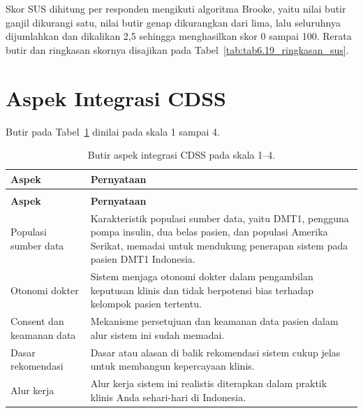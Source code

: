 Skor SUS dihitung per responden mengikuti algoritma Brooke, yaitu nilai butir ganjil dikurangi satu, nilai butir genap dikurangkan dari lima, lalu seluruhnya
dijumlahkan dan dikalikan 2,5 sehingga menghasilkan skor 0 sampai 100. Rerata butir dan ringkasan skornya disajikan pada Tabel~\ref{tab:tab6.19_ringkasan_sus}.

\section{Aspek Integrasi CDSS}
\label{lamp:instrumen-integrasi}

Butir pada Tabel~\ref{tab:lampC-integrasi} dinilai pada skala 1 sampai 4.

\begingroup
\setlength{\LTcapwidth}{\textwidth}
\begin{longtable}{@{}>{\raggedright\arraybackslash}p{3.300cm}>{\raggedright\arraybackslash}p{10.278cm}@{}}
\caption{Butir aspek integrasi CDSS pada skala 1--4.}
\label{tab:lampC-integrasi} \\
\toprule
\textbf{Aspek} & \textbf{Pernyataan} \\
\midrule
\endfirsthead

\multicolumn{2}{@{}l}{\small\emph{Tabel \thetable{} (lanjutan)}} \\
\toprule
\textbf{Aspek} & \textbf{Pernyataan} \\
\midrule
\endhead

\bottomrule
\endlastfoot

Populasi sumber data & Karakteristik populasi sumber data, yaitu DMT1, pengguna pompa insulin, dua belas pasien, dan populasi Amerika Serikat, memadai untuk mendukung penerapan sistem pada pasien DMT1 Indonesia. \\

Otonomi dokter & Sistem menjaga otonomi dokter dalam pengambilan keputusan klinis dan tidak berpotensi bias terhadap kelompok pasien tertentu. \\

Consent dan keamanan data & Mekanisme persetujuan dan keamanan data pasien dalam alur sistem ini sudah memadai. \\

Dasar rekomendasi & Dasar atau alasan di balik rekomendasi sistem cukup jelas untuk membangun kepercayaan klinis. \\

Alur kerja & Alur kerja sistem ini realistis diterapkan dalam praktik klinis Anda sehari-hari di Indonesia. \\
\end{longtable}
\endgroup

